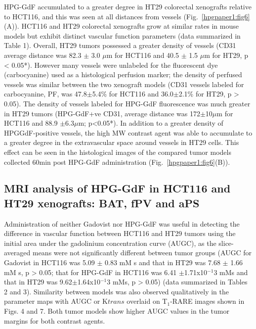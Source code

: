 HPG-GdF accumulated to a greater degree in HT29 colorectal xenografts relative to HCT116, and this was seen at all distances from vessels (Fig.~\ref{hpgpaper1:fig6}(A)).
HCT116 and HT29 colorectal xenografts grow at similar rates in mouse models but exhibit distinct vascular function parameters (data summarized in Table 1).
Overall, HT29 tumors possessed a greater density of vessels (CD31 average distance was 82.3 $\pm$ 3.0 $\mu$m for HCT116 and 40.5 $\pm$ 1.5 $\mu$m for HT29, p < 0.05*).
However many vessels were unlabeled for the fluorescent dye (carbocyanine) used as a histological perfusion marker; the density of perfused vessels was similar between the two xenograft models (CD31 vessels labeled for carbocyanine, PF, was 47.8$\pm$5.4\% for HCT116 and 36.0$\pm$2.1\% for HT29, p > 0.05).
The density of vessels labeled for HPG-GdF fluorescence was much greater in HT29 tumors (HPG-GdF+ve CD31, average distance was 172$\pm$10$\mu$m for HCT116 and 88.9 $\pm$6.3$\mu$m; p<0.05*).
In addition to a greater density of HPGGdF-positive vessels, the high MW contrast agent was able to accumulate to a greater degree in the extravascular space around vessels in HT29 cells.
This effect can be seen in the histological images of the compared tumor models collected 60min post HPG-GdF administration (Fig.~\ref{hpgpaper1:fig6}(B)).

\subsection{MRI analysis of HPG-GdF in HCT116 and HT29 xenografts: BAT, fPV and aPS}

Administration of neither Gadovist nor HPG-GdF was useful in detecting the difference in vascular function between HCT116 and HT29 tumors using the initial area under the gadolinium concentration curve (AUGC), as the slice-averaged means were not significantly different between tumor groups (AUGC for Gadovist in HCT116 was 5.09 $\pm$ 0.83 mM s and that in HT29 was 7.68 $\pm$ 1.66 mM s, p > 0.05; that for HPG-GdF in HCT116 was 6.41 $\pm$1.71x10$^{-1}$3 mMs and that in HT29 was 9.62$\pm$1.64x10$^{-1}$3 mMs, p > 0.05) (data summarized in Tables 2 and 3).
Similarity between models was also observed qualitatively in the parameter maps with AUGC or K${trans}$ overlaid on T$_1$-RARE images shown in Figs.
4 and 7.
Both tumor models show higher AUGC values in the tumor margins for both contrast agents.

